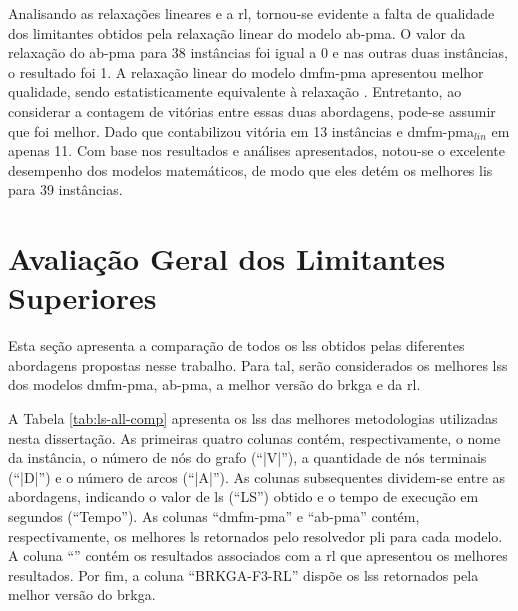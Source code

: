 Analisando as  relaxações lineares e a  \gls{rl}, tornou-se evidente a  falta de
qualidade dos limitantes obtidos pela relaxação linear do modelo \gls{ab-pma}. O
valor da relaxação do \gls{ab-pma} para 38 instâncias foi igual a 0 e nas outras
duas instâncias, o resultado foi 1.  A relaxação linear do modelo \gls{dmfm-pma}
apresentou  melhor qualidade,  sendo  estatisticamente  equivalente à  relaxação
{\rlq}.  Entretanto, ao  considerar  a  contagem de  vitórias  entre essas  duas
abordagens, pode-se assumir que {\rlq}  foi melhor. Dado que {\rlq} contabilizou
vitória em 13  instâncias e {\gls{dmfm-pma}$_{lin}$} em apenas 11.  Com base nos
resultados e análises apresentados, notou-se  o excelente desempenho dos modelos
matemáticos, de modo que eles detém os melhores \gls{li}s para 39 instâncias.

\section{Avaliação Geral dos Limitantes Superiores} \label{sec:resultados-li}

Esta seção apresenta a comparação de todos os \gls{ls}s obtidos pelas diferentes
abordagens propostas  nesse trabalho. Para  tal, serão considerados  os melhores
\gls{ls}s  dos   modelos  \gls{dmfm-pma},  \gls{ab-pma},  a   melhor  versão  do
\gls{brkga} e da \gls{rl}.

A Tabela \ref{tab:ls-all-comp} apresenta  os \gls{ls}s das melhores metodologias
utilizadas   nesta   dissertação.   As    primeiras   quatro   colunas   contém,
respectivamente, o  nome da  instância, o  número de nós  do grafo  (``|V|''), a
quantidade de nós terminais (``|D|'') e  o número de arcos (``|A|''). As colunas
subsequentes  dividem-se entre  as  abordagens, indicando  o  valor de  \gls{ls}
(``LS'')  obtido e  o  tempo de  execução em  segundos  (``Tempo''). As  colunas
``\gls{dmfm-pma}''  e  ``\gls{ab-pma}''  contém,  respectivamente,  os  melhores
\gls{ls}  retornados  pelo  resolvedor  \gls{pli} para  cada  modelo.  A  coluna
``{\rlq}''  contém os  resultados associados  com a  \gls{rl} que  apresentou os
melhores  resultados. Por  fim,  a coluna  ``BRKGA-F3-RL''  dispõe os  \gls{ls}s
retornados pela melhor versão do \gls{brkga}.

